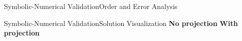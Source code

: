 \begin{frame}{Symbolic-Numerical Validation}{Order and Error Analysis}
  \centering{\small{}}
\end{frame}

\begin{frame}{Symbolic-Numerical Validation}{Solution Visualization}
  \vspace{1.0em}
  \centering\small
  \textbf{No projection}%
  \hspace{10.0em}%
  \textbf{With projection}
\end{frame}

